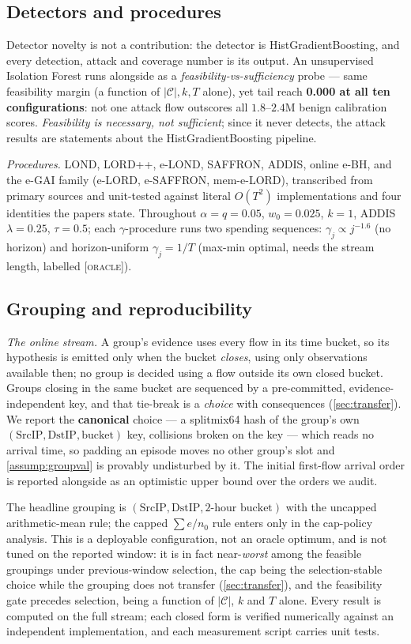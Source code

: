 \documentclass[conference]{IEEEtran}
\newcommand{\Cal}{\mathcal{C}}
\newcommand{\nCal}{\lvert\Cal\rvert}
\newcommand{\oracle}{\textsc{[oracle]}}
\begin{document}
\subsection{Detectors and procedures}

Detector novelty is not a contribution: the detector is HistGradientBoosting, and every detection,
attack and coverage number is its output. An unsupervised Isolation Forest runs alongside as a
\emph{feasibility-vs-sufficiency} probe --- same feasibility margin (a function of $\nCal,k,T$ alone),
yet tail reach \textbf{0.000 at all ten configurations}: not one attack flow outscores all
$1.8$--$2.4$M benign calibration scores. \emph{Feasibility is necessary, not sufficient}; since it
never detects, the attack results are statements about the HistGradientBoosting pipeline.

\emph{Procedures.} LOND, LORD++, e-LOND, SAFFRON, ADDIS, online e-BH, and the e-GAI family (e-LORD,
e-SAFFRON, mem-e-LORD), transcribed from primary sources and unit-tested against literal $O(T^2)$
implementations and four identities the papers state. Throughout $\alpha = q = 0.05$, $w_0 = 0.025$,
$k = 1$, ADDIS $\lambda = 0.25$, $\tau = 0.5$; each $\gamma$-procedure runs two spending sequences:
$\gamma_j \propto j^{-1.6}$ (no horizon) and horizon-uniform $\gamma_j = 1/T$ (max-min optimal, needs
the stream length, labelled \oracle).

\subsection{Grouping and reproducibility}

\emph{The online stream.} A group's evidence uses every flow in its time bucket, so its hypothesis is
emitted only when the bucket \emph{closes}, using only observations available then; no group is decided
using a flow outside its own closed bucket. Groups closing in the same bucket are sequenced by a
pre-committed, evidence-independent key, and that tie-break is a \emph{choice} with consequences
(\cref{sec:transfer}). We report the \textbf{canonical} choice --- a splitmix64 hash of the group's own
$(\mathrm{SrcIP},\mathrm{DstIP},\text{bucket})$ key, collisions broken on the key --- which reads no
arrival time, so padding an episode moves no other group's slot and \cref{assump:groupval} is provably
undisturbed by it. The initial first-flow arrival order is reported alongside as an
optimistic upper bound over the orders we audit.

The headline grouping is $(\mathrm{SrcIP}, \mathrm{DstIP}, \text{2-hour bucket})$ with the
uncapped arithmetic-mean rule; the capped $\sum e/n_0$ rule enters only in the cap-policy analysis.
This is a deployable configuration, not an oracle optimum, and is not tuned on the reported window: it
is in fact near-\emph{worst} among the feasible groupings under previous-window selection, the cap
being the selection-stable choice while the grouping does not transfer (\cref{sec:transfer}), and the
feasibility gate precedes selection, being a function of $\nCal$, $k$ and $T$ alone.
Every result is computed on the full stream; each closed form is verified
numerically against an independent implementation, and each measurement script carries unit tests.
\end{document}
